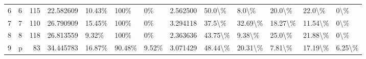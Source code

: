 \begin{tabular}{llrrlllrlllll}
6 &  6 &      115 &   22.582609 &              10.43\% &                                       100\% &                                               0\% &                2.562500 &        50.0\textbackslash \% &           8.0\textbackslash \% &                20.0\textbackslash \% &              22.0\textbackslash \% &           0\textbackslash \% \\
7 &  7 &      110 &   26.790909 &              15.45\% &                                       100\% &                                               0\% &                3.294118 &        37.5\textbackslash \% &         32.69\textbackslash \% &               18.27\textbackslash \% &             11.54\textbackslash \% &           0\textbackslash \% \\
8 &  8 &      118 &   26.813559 &               9.32\% &                                       100\% &                                               0\% &                2.363636 &       43.75\textbackslash \% &          9.38\textbackslash \% &                25.0\textbackslash \% &             21.88\textbackslash \% &           0\textbackslash \% \\
9 &  p &       83 &   34.445783 &              16.87\% &                                     90.48\% &                                            9.52\% &                3.071429 &       48.44\textbackslash \% &         20.31\textbackslash \% &                7.81\textbackslash \% &             17.19\textbackslash \% &        6.25\textbackslash \% \\
\bottomrule
\end{tabular}

